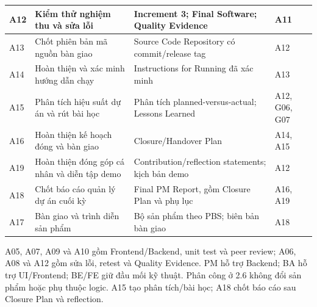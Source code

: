 \begin{table}[H]
\begin{tabularx}{\linewidth}{|p{0.8cm}|p{2.6cm}|>{\raggedright\arraybackslash}X|p{2.2cm}|}
A12 & Kiểm thử nghiệm thu và sửa lỗi & Increment 3; Final Software; Quality Evidence & A11 \\ \hline
A13 & Chốt phiên bản mã nguồn bàn giao & Source Code Repository có commit/release tag & A12 \\ \hline
A14 & Hoàn thiện và xác minh hướng dẫn chạy & Instructions for Running đã xác minh & A13 \\ \hline
A15 & Phân tích hiệu suất dự án và rút bài học & Phân tích planned-versus-actual; Lessons Learned & A12, G06, G07 \\ \hline
A16 & Hoàn thiện kế hoạch đóng và bàn giao & Closure/Handover Plan & A14, A15 \\ \hline
A19 & Hoàn thiện đóng góp cá nhân và diễn tập demo & Contribution/reflection statements; kịch bản demo & A12 \\ \hline
A18 & Chốt báo cáo quản lý dự án cuối kỳ & Final PM Report, gồm Closure Plan và phụ lục & A16, A19 \\ \hline
A17 & Bàn giao và trình diễn sản phẩm & Bộ sản phẩm theo PBS; biên bản bàn giao & A18 \\ \hline
\end{tabularx}
\end{table}

\noindent A05, A07, A09 và A10 gồm Frontend/Backend, unit test và peer review; A06, A08 và A12 gồm sửa lỗi, retest và Quality Evidence. PM hỗ trợ Backend; BA hỗ trợ UI/Frontend; BE/FE giữ đầu mối kỹ thuật. Phân công ở 2.6 không đổi sản phẩm hoặc phụ thuộc logic. A15 tạo phân tích/bài học; A18 chốt báo cáo sau Closure Plan và reflection.
\newpage

